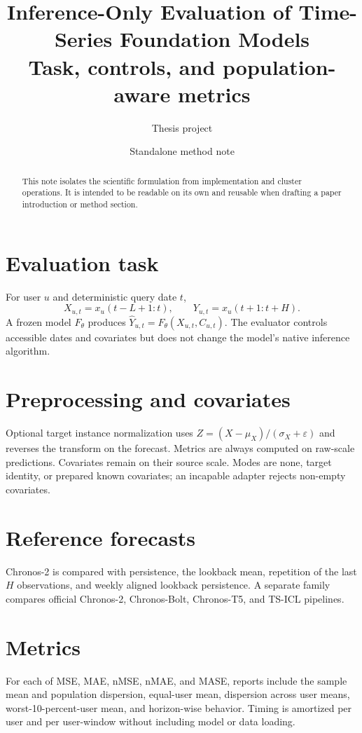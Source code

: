 \documentclass[10pt]{article}
\title{\color{navy}Inference-Only Evaluation of Time-Series Foundation Models\\[3pt]\large Task, controls, and population-aware metrics}
\author{Thesis project}
\date{Standalone method note}
\begin{document}
\maketitle
\begin{abstract}
This note isolates the scientific formulation from implementation and cluster
operations. It is intended to be readable on its own and reusable when drafting
a paper introduction or method section.
\end{abstract}

\section{Evaluation task}
For user $u$ and deterministic query date $t$,
\[
 X_{u,t}=x_u(t-L+1{:}t),\qquad
 Y_{u,t}=x_u(t+1{:}t+H).
\]
A frozen model $F_\theta$ produces
$\widehat Y_{u,t}=F_\theta(X_{u,t},C_{u,t})$. The evaluator controls
accessible dates and covariates but does not change the model's native
inference algorithm.

\section{Preprocessing and covariates}
Optional target instance normalization uses
$Z=(X-\mu_X)/(\sigma_X+\varepsilon)$ and reverses the transform on the
forecast. Metrics are always computed on raw-scale predictions. Covariates
remain on their source scale. Modes are none, target identity, or prepared
known covariates; an incapable adapter rejects non-empty covariates.

\section{Reference forecasts}
Chronos-2 is compared with persistence, the lookback mean, repetition of the
last $H$ observations, and weekly aligned lookback persistence. A separate
family compares official Chronos-2, Chronos-Bolt, Chronos-T5, and TS-ICL
pipelines.

\section{Metrics}
For each of MSE, MAE, nMSE, nMAE, and MASE, reports include the sample mean and
population dispersion, equal-user mean, dispersion across user means,
worst-10-percent-user mean, and horizon-wise behavior. Timing is amortized per
user and per user-window without including model or data loading.
\end{document}
